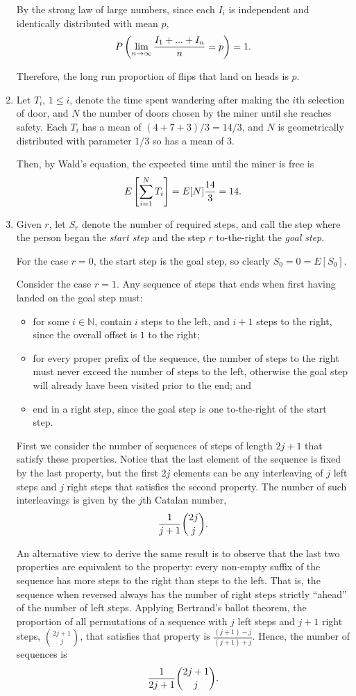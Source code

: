 \documentclass{article}
\begin{document}
\begin{enumerate}
    By the strong law of large numbers, since each $I_i$ is independent and identically distributed with mean $p$,
    \[P\left( \lim_{n\to\infty} \frac{I_1+...+I_n}{n} = p \right) = 1\text.\]

    Therefore, the long run proportion of flips that land on heads is $p$.
\item
    Let $T_i$, $1 \leq i$, denote the time spent wandering after making the $i$th selection of door, and $N$ the number of doors chosen by the miner until she reaches safety.
    Each $T_i$ has a mean of $(4+7+3)/3 = 14/3$, and
    $N$ is geometrically distributed with parameter $1/3$ so has a mean of $3$.

    Then, by Wald's equation, the expected time until the miner is free is
    \[
    E\left[\sum_{i=1}^NT_i\right] = E[N]\frac{14}{3} = 14 \text.
    \]
\item
    Given $r$, let $S_r$ denote the number of required steps, and call the step where the person began the \emph{start step} and the step $r$ to-the-right the \emph{goal step}.

    For the case $r=0$, the start step is the goal step, so clearly $S_0=0=E[S_0]$.

    Consider the case $r=1$. Any sequence of steps that ends when first having landed on the goal step must:
    \begin{itemize}
    \item   for some $i\in\mathbb{N}$, contain $i$ steps to the left, and $i+1$ steps to the right, since the overall offset is $1$ to the right;
    \item   for every proper prefix of the sequence, the number of steps to the right must never exceed the number of steps to the left,
            otherwise the goal step will already have been visited prior to the end; and
    \item   end in a right step, since the goal step is one to-the-right of the start step.
    \end{itemize}

    First we consider the number of sequences of steps of length $2j+1$ that satisfy these properties.
    Notice that the last element of the sequence is fixed by the last property, but the first $2j$ elements can be any interleaving of $j$ left steps and $j$ right steps that
    satisfies the second property.
    The number of such interleavings is given by the $j$th Catalan number,
    \[ \frac{1}{j+1}{2j \choose j}\text. \]

    An alternative view to derive the same result is to observe that the last two properties are equivalent to the property: every non-empty suffix of the sequence has
    more steps to the right than steps to the left. That is, the sequence when reversed always has the number of right steps strictly ``ahead'' of the number of
    left steps. Applying Bertrand's ballot theorem, the proportion of all permutations of a sequence with $j$ left steps and $j+1$ right steps, ${2j+1 \choose j}$,
    that satisfies that property is $\frac{(j+1)-j}{(j+1)+j}$. Hence, the number of sequences is
    \[ \frac{1}{2j+1}{2j+1 \choose j}\text. \]


\end{enumerate}
\end{document}

